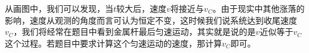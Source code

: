 \documentclass{ctexbook}
\begin{document}
	\hspace*{\fill}
	
	\hspace*{\fill}
	
	\hspace*{\fill}
	
	\hspace*{\fill}
	
	\hspace*{\fill}
	
	\hspace*{\fill}
	
	\hspace*{\fill}
	
	\hspace*{\fill}
	
	\hspace*{\fill}
	
	\hspace*{\fill}
	
	\hspace*{\fill}
	
	\hspace*{\fill}
	
	\hspace*{\fill}
	
	\hspace*{\fill}
	
	\hspace*{\fill}
	
	\hspace*{\fill}
	
	\hspace*{\fill}
	
	\hspace*{\fill}
	
	\hspace*{\fill}
	
	\hspace*{\fill}
	
	\hspace*{\fill}
	
	\hspace*{\fill}
	
	\hspace*{\fill}
	
	\hspace*{\fill}
	
	\hspace*{\fill}
	
	从画图中，我们可以发现，当$t$较大后，速度$v$将接近与$v_C$。由于现实中其他涨落的影响，速度从观测的角度而言可认为恒定不变，这时候我们说系统达到收尾速度$v_C$，我们将经常在题目中看到金属杆最后匀速运动，其实就是说的是$v$近似等于$v_C$这个过程。若题目中要求计算这个匀速运动的速度，那计算$v_C$即可。
	
\end{document}
